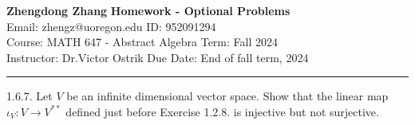 \documentclass[a4paper, 12pt]{article}
\begin{document}
\noindent
\large\textbf{Zhengdong Zhang} \hfill \textbf{Homework - Optional Problems}   \\
Email: zhengz@uoregon.edu \hfill ID: 952091294 \\
\normalsize Course: MATH 647 - Abstract Algebra  \hfill Term: Fall 2024\\
Instructor: Dr.Victor Ostrik \hfill Due Date: End of fall term, 2024 \\
\noindent\rule{7in}{2.8pt}
\begin{problem}{1.6.7.}
Let \(V\) be an infinite dimensional vector space. Show that the linear map \(\iota_V:V\rightarrow V^{**}\) defined just before Exercise 1.2.8. is injective but not surjective.
\end{problem} 
\end{document}
